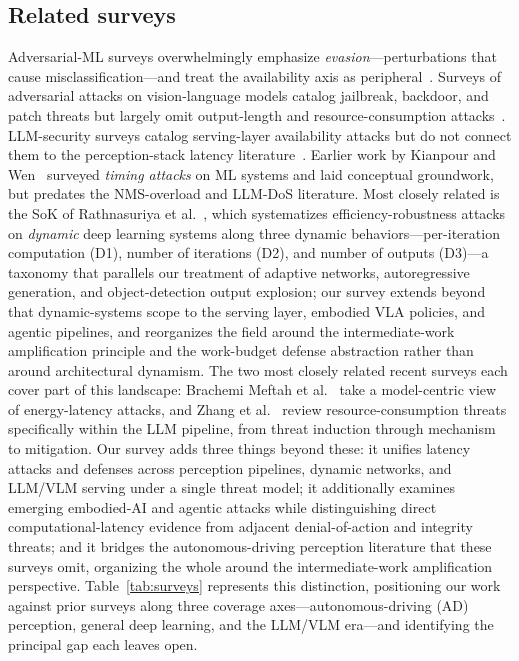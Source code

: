 \documentclass[acmsmall,screen,review,nonacm]{acmart}
\begin{document}
\subsection{Related surveys}
Adversarial-ML surveys overwhelmingly emphasize \emph{evasion}---perturbations that cause misclassification---and treat the availability axis as peripheral~\cite{liao2025llmsurvey,aguilera2025llmsecurity,chowdhury2024breakingdown}. Surveys of adversarial attacks on vision-language models catalog jailbreak, backdoor, and patch threats but largely omit output-length and resource-consumption attacks~\cite{hossain2026vlmsurvey,fu2025vlmdefense,dai2025vlmattacks}. LLM-security surveys catalog serving-layer availability attacks but do not connect them to the perception-stack latency literature~\cite{xu2025llmattacks}. Earlier work by Kianpour and Wen~\cite{kianpour2019timing} surveyed \emph{timing attacks} on ML systems and laid conceptual groundwork, but predates the NMS-overload and LLM-DoS literature.  Most closely related is the SoK of Rathnasuriya et al.~\cite{rathnasuriya2025sok}, which systematizes efficiency-robustness attacks on \emph{dynamic} deep learning systems along three dynamic behaviors---per-iteration computation (D1), number of iterations (D2), and number of outputs (D3)---a taxonomy that parallels our treatment of adaptive networks, autoregressive generation, and object-detection output explosion; our survey extends beyond that dynamic-systems scope to the serving layer, embodied VLA policies, and agentic pipelines, and reorganizes the field around the intermediate-work amplification principle and the work-budget defense abstraction rather than around architectural dynamism. The two most closely related recent surveys each cover part of this landscape: Brachemi Meftah et al.~\cite{brachemi2026energy} take a model-centric view of energy-latency attacks, and Zhang et al.~\cite{zhang2026resource} review resource-consumption threats specifically within the LLM pipeline, from threat induction through mechanism to mitigation. Our survey adds three things beyond these: it unifies latency attacks and defenses across perception pipelines, dynamic networks, and LLM/VLM serving under a single threat model; it additionally examines emerging embodied-AI and agentic attacks while distinguishing direct computational-latency evidence from adjacent denial-of-action and integrity threats; and it bridges the autonomous-driving perception literature that these surveys omit, organizing the whole around the intermediate-work amplification perspective. Table~\ref{tab:surveys} represents this distinction, positioning our work against prior surveys along three coverage axes---autonomous-driving (AD) perception, general deep learning, and the LLM/VLM era---and identifying the principal gap each leaves open.
\end{document}
